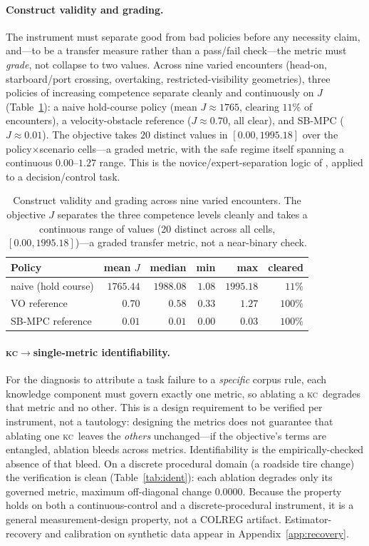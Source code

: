 \documentclass{article}
\newcommand{\kc}{\textsc{kc}}
\begin{document}
\paragraph{Construct validity and grading.} The instrument must separate good from bad policies before
any necessity claim, and---to be a transfer measure rather than a pass/fail check---the metric must
\emph{grade}, not collapse to two values. Across nine varied encounters (head-on, starboard/port
crossing, overtaking, restricted-visibility geometries), three policies of increasing competence
separate cleanly and continuously on $J$ (Table~\ref{tab:construct}): a naive hold-course policy
(mean $J\approx1765$, clearing $11\%$ of encounters), a velocity-obstacle reference ($J\approx0.70$, all
clear), and SB-MPC ($J\approx0.01$). The objective takes $20$ distinct values in $[0.00, 1995.18]$
over the policy$\times$scenario cells---a graded metric, with the safe regime itself spanning a
continuous $0.00$--$1.27$ range. This is the novice/expert-separation logic of
\citet{vandongen2007lapsim}, applied to a decision/control task.

\begin{table}[t]
\centering
\small
\begin{tabular}{@{}lrrrrr@{}}
\toprule
Policy & mean $J$ & median & min & max & cleared \\
\midrule
naive (hold course) & $1765.44$ & $1988.08$ & $1.08$ & $1995.18$ & $11\%$ \\
VO reference & $0.70$ & $0.58$ & $0.33$ & $1.27$ & $100\%$ \\
SB-MPC reference & $0.01$ & $0.01$ & $0.00$ & $0.03$ & $100\%$ \\
\bottomrule
\end{tabular}
\caption{Construct validity and grading across nine varied encounters. The objective $J$
separates the three competence levels cleanly and takes a continuous range of values
(20 distinct across all cells, $[0.00, 1995.18]$)---a graded transfer metric, not a near-binary check.}
\label{tab:construct}
\end{table}

\paragraph{\kc$\to$single-metric identifiability.} For the diagnosis to attribute a task failure to a
\emph{specific} corpus rule, each knowledge component must govern exactly one metric, so ablating a
\kc\ degrades that metric and no other. This is a design requirement to be verified per instrument,
not a tautology: designing the metrics does not guarantee that ablating one \kc\ leaves the
\emph{others} unchanged---if the objective's terms are entangled, ablation bleeds across metrics.
Identifiability is the empirically-checked absence of that bleed. On a discrete procedural domain
(a roadside tire change) the verification is clean (Table~\ref{tab:ident}): each ablation degrades only
its governed metric, maximum off-diagonal change $0.0000$. Because the property holds on both a
continuous-control and a discrete-procedural instrument, it is a general measurement-design property,
not a COLREG artifact. Estimator-recovery and calibration on synthetic data appear in
Appendix~\ref{app:recovery}.
\end{document}
